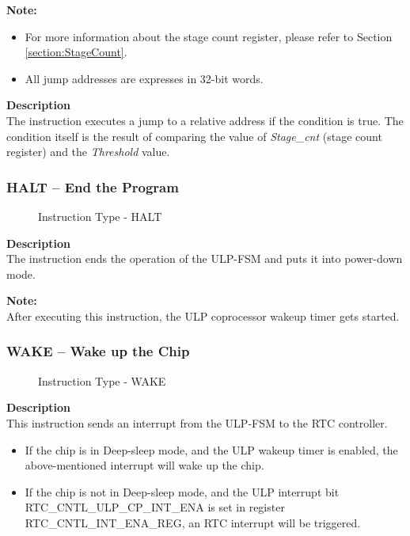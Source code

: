 \documentclass[main\_\_EN.tex]{subfiles}
\begin{document}
\textbf{Note:}
\begin{itemize}
    \item For more information about the stage count register, please refer to Section \ref{section:StageCount}.
    \item All jump addresses are expresses in 32-bit words.
\end{itemize}

\textbf{Description} \\
The instruction executes a jump to a relative address if the condition is true. The condition itself is the result of comparing the value of \textit{Stage\_cnt} (stage count register) and the \textit{Threshold} value.

\subsubsection{HALT – End the Program} \label{subsection:HALT}

%
%
\begin{figure}[!ht ]
    \centering
    \caption{Instruction Type - HALT}
    \label{figure:HALT}
\end{figure}

\textbf{Description} \\
The instruction ends the operation of the ULP-FSM and puts it into power-down mode.


\textbf{Note:} \\
After executing this instruction, the ULP coprocessor wakeup timer gets started.


\subsubsection{WAKE – Wake up the Chip}

%
%
%
%
\begin{figure}[!ht ]
    \centering
    \caption{Instruction Type - WAKE}
    \label{figure:WAKE}
\end{figure}

\textbf{Description} \\
This instruction sends an interrupt from the ULP-FSM to the RTC controller.

\begin{itemize}
    \item If the chip is in Deep-sleep mode, and the ULP wakeup timer is enabled, the above-mentioned interrupt will wake up the chip.
    \item If the chip is not in Deep-sleep mode, and the ULP interrupt bit RTC\_CNTL\_ULP\_CP\_INT\_ENA is set in register RTC\_CNTL\_INT\_ENA\_REG, an RTC interrupt will be triggered.
\end{itemize}
\end{document}
